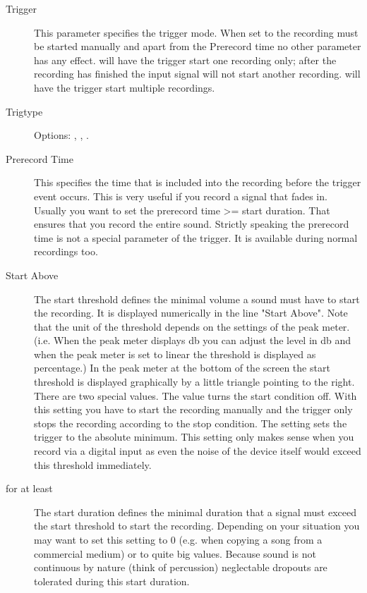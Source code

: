   \begin{description}
  \item[Trigger]
	This parameter specifies the trigger mode.  When set to 
	the recording must be started manually and apart from the Prerecord time no
	other parameter has any effect.   will have the trigger start
	one recording only; after the recording has finished the input signal will
	not start another recording.  will have the trigger start 
	multiple recordings.
	
  \item[Trigtype]
	Options: , , .
	
  \item[Prerecord Time]
    This specifies the time that is included into the recording before the
	trigger event occurs. This is very useful if you record a signal that fades
	in. Usually you want to set the prerecord time >= start duration. That
	ensures that you record the entire sound. Strictly speaking the prerecord
	time is not a special parameter of the trigger. It is available during normal
	recordings too.  
	
  \item[Start Above]
	The start threshold defines the minimal volume a sound must have to start the
	recording. It is displayed numerically in the line "Start Above". Note that
	the unit of the threshold depends on the settings of the peak meter. (i.e.
	When the peak meter displays db you can adjust the level in db and when the
	peak meter is set to linear the threshold is displayed as percentage.) In the
	peak meter at the bottom of the screen the start threshold is displayed
	graphically by a little triangle pointing to the right. There are two special
	values. The value  turns the start condition off.  With this
	setting you have to start the recording manually and the trigger only stops
	the recording according to the stop condition. The setting 
	sets the trigger to the absolute minimum. This setting only makes sense when
	you record via a digital input as even the noise of the device itself would
	exceed this threshold immediately.
	
  \item[for at least]
	The start duration defines the minimal duration that a signal must exceed the
	start threshold to start the recording. Depending on your situation you may
	want to set this setting to 0 (e.g. when copying a song from a commercial
	medium) or to quite big values. Because sound is not continuous by nature
	(think of percussion) neglectable dropouts are tolerated during this start
	duration.
	

\end{description}
